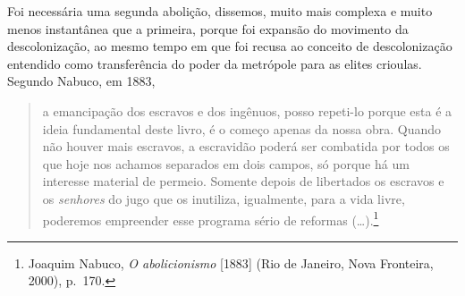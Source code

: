 Foi necessária uma segunda abolição, dissemos, muito mais complexa e
muito menos instantânea que a primeira, porque foi expansão do movimento
da descolonização, ao mesmo tempo em que foi recusa ao conceito de
descolonização entendido como transferência do poder da metrópole para
as elites crioulas. Segundo Nabuco, em 1883,

\begin{quote}
a emancipação dos escravos e dos ingênuos, posso repeti-lo porque esta é
a ideia fundamental deste livro, é o começo apenas da nossa obra. Quando
não houver mais escravos, a escravidão poderá ser combatida por todos os
que hoje nos achamos separados em dois campos, só porque há um interesse
material de permeio. Somente depois de libertados os escravos e os
\textit{senhores} do jugo que os inutiliza, igualmente, para a vida livre,
poderemos empreender esse programa sério de reformas (\dots{}).\footnote{Joaquim
  Nabuco, \textit{O abolicionismo} {[}1883{]} (Rio de Janeiro, Nova
  Fronteira, 2000), p.~170.}
\end{quote}

